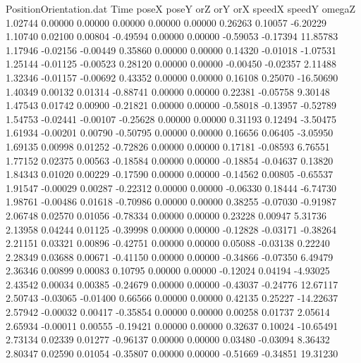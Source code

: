 \begin{filecontents}{PositionOrientation.dat}
Time poseX poseY orZ orY orX speedX speedY omegaZ
   1.02744    0.00000    0.00000     0.00000    0.00000    0.00000    0.26263    0.10057   -6.20229
   1.10740    0.02100    0.00804    -0.49594    0.00000    0.00000   -0.59053   -0.17394   11.85783
   1.17946   -0.02156   -0.00449     0.35860    0.00000    0.00000    0.14320   -0.01018   -1.07531
   1.25144   -0.01125   -0.00523     0.28120    0.00000    0.00000   -0.00450   -0.02357    2.11488
   1.32346   -0.01157   -0.00692     0.43352    0.00000    0.00000    0.16108    0.25070  -16.50690
   1.40349    0.00132    0.01314    -0.88741    0.00000    0.00000    0.22381   -0.05758    9.30148
   1.47543    0.01742    0.00900    -0.21821    0.00000    0.00000   -0.58018   -0.13957   -0.52789
   1.54753   -0.02441   -0.00107    -0.25628    0.00000    0.00000    0.31193    0.12494   -3.50475
   1.61934   -0.00201    0.00790    -0.50795    0.00000    0.00000    0.16656    0.06405   -3.05950
   1.69135    0.00998    0.01252    -0.72826    0.00000    0.00000    0.17181   -0.08593    6.76551
   1.77152    0.02375    0.00563    -0.18584    0.00000    0.00000   -0.18854   -0.04637    0.13820
   1.84343    0.01020    0.00229    -0.17590    0.00000    0.00000   -0.14562    0.00805   -0.65537
   1.91547   -0.00029    0.00287    -0.22312    0.00000    0.00000   -0.06330    0.18444   -6.74730
   1.98761   -0.00486    0.01618    -0.70986    0.00000    0.00000    0.38255   -0.07030   -0.91987
   2.06748    0.02570    0.01056    -0.78334    0.00000    0.00000    0.23228    0.00947    5.31736
   2.13958    0.04244    0.01125    -0.39998    0.00000    0.00000   -0.12828   -0.03171   -0.38264
   2.21151    0.03321    0.00896    -0.42751    0.00000    0.00000    0.05088   -0.03138    0.22240
   2.28349    0.03688    0.00671    -0.41150    0.00000    0.00000   -0.34866   -0.07350    6.49479
   2.36346    0.00899    0.00083     0.10795    0.00000    0.00000   -0.12024    0.04194   -4.93025
   2.43542    0.00034    0.00385    -0.24679    0.00000    0.00000   -0.43037   -0.24776   12.67117
   2.50743   -0.03065   -0.01400     0.66566    0.00000    0.00000    0.42135    0.25227  -14.22637
   2.57942   -0.00032    0.00417    -0.35854    0.00000    0.00000    0.00258    0.01737    2.05614
   2.65934   -0.00011    0.00555    -0.19421    0.00000    0.00000    0.32637    0.10024  -10.65491
   2.73134    0.02339    0.01277    -0.96137    0.00000    0.00000    0.03480   -0.03094    8.36432
   2.80347    0.02590    0.01054    -0.35807    0.00000    0.00000   -0.51669   -0.34851   19.31230

\end{filecontents}
